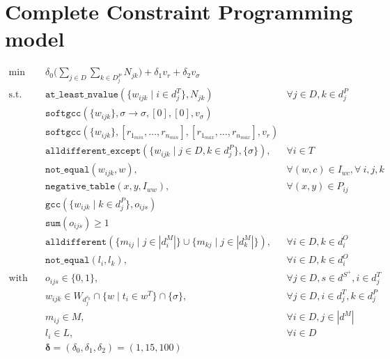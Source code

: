 \documentclass[../../thesis.tex]{subfiles}
\begin{document}
\chapter{Complete Constraint Programming model}
 
\begin{align*}
  \text{min} \quad &\delta_0 \big( \sum_{j \in D} \sum_{k \in D^P_j} N_{jk} \big) + \delta_1 v_r + \delta_2 v_{\sigma} \\
  \text{s.t.} \quad &\texttt{at\_least\_nvalue}(\{ w_{ijk} \mid i \in d^T_j \}, N_{jk}) &\forall j \in D, k \in d^P_j \\
  &\texttt{softgcc}(\{ w_{ijk} \}, \sigma \rightarrow \sigma, [0], [0], v_{\sigma})  \\ 
  &\texttt{softgcc}(\{ w_{ijk} \}, [r_{1_{min}}, \dots, r_{n_{min}}], [r_{1_{max}}, \dots, r_{n_{max}}], v_{r}) \\
  &\texttt{alldifferent\_except}(\{w_{ijk} \mid j \in D, k \in d_j^P \}, \{ \sigma \}), &\forall i \in T \\ 
  &\texttt{not\_equal}(w_{ijk}, w),  &\forall (w, c) \in I_{wc}, \forall \ i, j, k \\
  &\texttt{negative\_table}(x, y, I_{ww}),  &\forall (x, y) \in P_{ij} \\ 
  &\texttt{gcc}(\{ w_{ijk} \mid k \in d^P_j \}, o_{ijs}) \\ 
  &\texttt{sum}(o_{ijs}) \geq 1 \\
  &\texttt{alldifferent}(\{ m_{ij} \mid j \in |d_i^M| \} \cup \{ m_{kj} \mid j \in |d_k^M| \}), &\forall i \in D, k \in d^O_i \\
  &\texttt{not_equal}(l_{i}, l_{k}), &\forall i \in D, k \in d^O_i \\
  \text{with} \quad & o_{ijs} \in \{ 0, 1 \}, & \forall j \in D, s \in d^{S^{+}}, i \in d^T_j \\ 
  &w_{ijk} \in W_{d^{s_k}_j} \cap \{ w \mid t_i \in w^T \} \cap \{ \sigma \},& \forall j \in D, i \in d^T_j, k \in d^P_j \\ 
  &m_{ij} \in M, & \forall i \in D, j \in |d^M| \\ 
  &l_{i} \in L, & \forall i \in D \\
  &\bm{\delta} = (\delta_0, \delta_1, \delta_2) = (1, 15, 100)
\end{align*}
\end{document}
